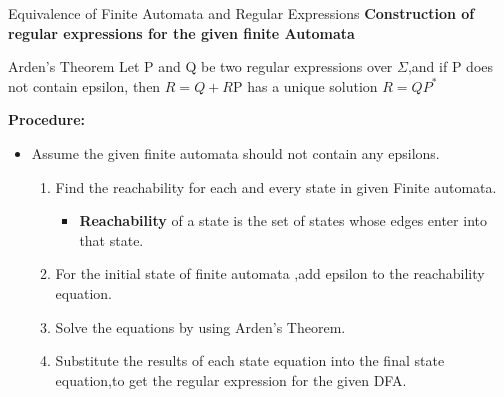 \documentclass{beamer}
\begin{document}
\begin{frame}{Equivalence of Finite Automata and Regular Expressions}
	\textbf{Construction of regular expressions for the given finite Automata}
	\begin{block}{Arden’s Theorem}
		Let P and Q be two regular expressions over $\Sigma$,and if P does not contain 
		epsilon, then $R=Q+R$P has a unique solution $R=QP^*$
	\end{block}
\textbf{Procedure:}
\begin{itemize}
	\item Assume the given finite automata should not contain any epsilons.
	\begin{enumerate}
		\item Find the reachability for each and every state in given Finite 
		automata.
		\begin{itemize}
			\item \textbf{Reachability} of a state is the set of states whose edges enter into that state. 
		\end{itemize}
		\item For the initial state of finite automata ,add epsilon to the 
		reachability equation.
		\item Solve the equations by using Arden’s Theorem.
		\item Substitute the results of each state equation into the final state 
		equation,to get the regular expression for the given DFA.
		
	\end{enumerate}
\end{itemize}
\end{frame}
\end{document}
